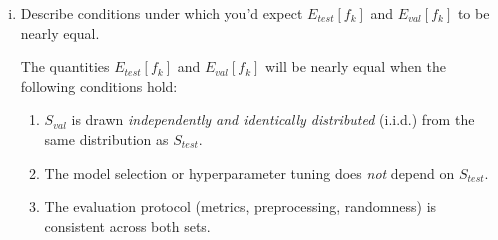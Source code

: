 \documentclass[a4paper]{article}
\begin{document}
\begin{enumerate}[(i)]

    \item Describe conditions under which you’d expect $E_\mathit{test}[f_k ]$ and $E_\mathit{val} [f_k]$ to be nearly equal.


    The quantities $E_\mathit{test}[f_k]$ and $E_\mathit{val}[f_k]$ will be nearly equal when the following conditions hold:
    \begin{enumerate}[1.]
        \item $S_\mathit{val}$ is drawn \emph{independently and identically distributed} (i.i.d.) from the same distribution as $S_\mathit{test}$.
        \item The model selection or hyperparameter tuning does \emph{not} depend on $S_\mathit{test}$.
        \item The evaluation protocol (metrics, preprocessing, randomness) is consistent across both sets.
    \end{enumerate}
\end{enumerate}
\end{document}
